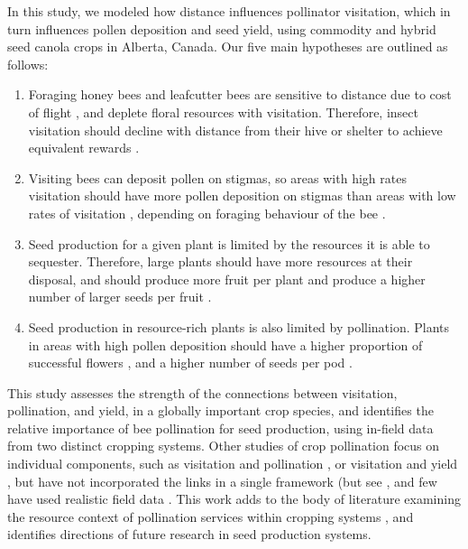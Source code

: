 \documentclass[12pt, draft]{article} %
\begin{document}
In this study, we modeled how distance influences pollinator visitation, which in turn influences pollen deposition and seed yield, using commodity and hybrid seed canola crops in Alberta, Canada.
Our five main hypotheses are outlined as follows:
\begin{enumerate} 
    \item Foraging honey bees and leafcutter bees are sensitive to distance due to cost of flight \citep{schmid1985}, and deplete floral resources with visitation. Therefore, insect visitation should decline with distance from their hive or shelter to achieve equivalent rewards \citep{dukas1998, cresswell2000}. 
    \item Visiting bees can deposit pollen on stigmas, so areas with high rates visitation should have more pollen deposition on stigmas than areas with low rates of visitation \citep{mesquida1988c, hoyle2007}, depending on foraging behaviour of the bee \citep{free1983}.
    \item Seed production for a given plant is limited by the resources it is able to sequester. Therefore, large plants should have more resources at their disposal, and should produce more fruit per plant and produce a higher number of larger seeds per fruit \citep{galen1985, lawrence1993, marini2015}.
    \item Seed production in resource-rich plants is also limited by pollination. Plants in areas with high pollen deposition should have a higher proportion of successful flowers \citep{sabbahi2005}, and a higher number of seeds per pod \citep{morandin2005}.
\end{enumerate}

This study assesses the strength of the connections between visitation, pollination, and yield, in a globally important crop species, and identifies the relative importance of bee pollination for seed production, using in-field data from two distinct cropping systems.
Other studies of crop pollination focus on individual components, such as visitation and pollination \citep{cresswell1999, thomson2001}, or visitation and yield \citep{steffan2003, manning2005, hudewenz2013}, but have not incorporated the links in a single framework (but see \citealp{saez2018}, and few have used realistic field data \citep{morandin2005, isaacs2010}.
This work adds to the body of literature examining the resource context of pollination services \citep{haig1988} within cropping systems \citep{marini2015, tamburini2016, fijen2018, tamburini2019}, and identifies directions of future research in seed production systems.
\end{document}
